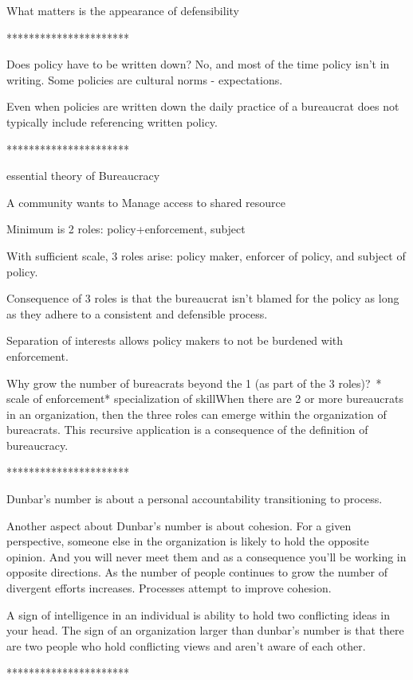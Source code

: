 What matters is the appearance of defensibility

**********************

Does policy have to be written down? 
No, and most of the time policy isn't in writing. Some policies are cultural norms - expectations. 

Even when policies are written down the daily practice of a bureaucrat does not typically include referencing written policy.

**********************

essential theory of Bureaucracy

A community wants to Manage access to shared resource

Minimum is 2 roles: policy+enforcement, subject

With sufficient scale, 3 roles arise: policy maker, enforcer of policy, and subject of policy.

Consequence of 3 roles is that the bureaucrat isn't blamed for the policy as long as they adhere to a consistent and defensible process. 

Separation of interests allows policy makers to not be burdened with enforcement.

Why grow the number of bureacrats beyond the 1 (as part of the 3 roles)? * scale of enforcement* specialization of skillWhen there are 2 or more bureaucrats in an organization, then the three roles can emerge within the organization of bureacrats. This recursive application is a consequence of the definition of bureaucracy.

**********************

Dunbar's number is about a personal accountability transitioning to process.

Another aspect about Dunbar's number is about cohesion. For a given perspective, someone else in the organization is likely to hold the opposite opinion. And you will never meet them and as a consequence you'll be working in opposite directions. As the number of people continues to grow the number of divergent efforts increases. Processes attempt to improve cohesion.

A sign of intelligence in an individual is ability to hold two conflicting ideas in your head. The sign of an organization larger than dunbar's number is that there are two people who hold conflicting views and aren't aware of each other.

**********************



